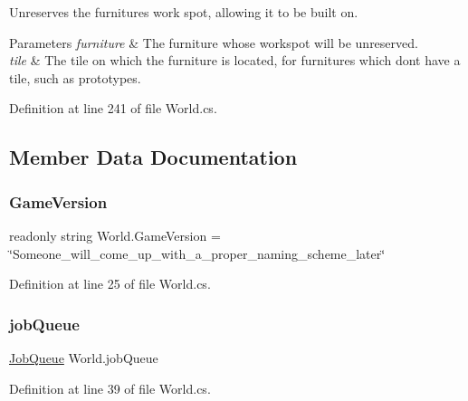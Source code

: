 Unreserves the furniture\textquotesingle{}s work spot, allowing it to be built on. 


\begin{DoxyParams}{Parameters}
{\em furniture} & The furniture whose workspot will be unreserved.\\
\hline
{\em tile} & The tile on which the furniture is located, for furnitures which don\textquotesingle{}t have a tile, such as prototypes.\\
\hline
\end{DoxyParams}


Definition at line 241 of file World.\+cs.



\subsection{Member Data Documentation}
\mbox{\label{class_world_a48a644d09cb24d4bd6c79cf7d438dc44}} 
\subsubsection{\texorpdfstring{Game\+Version}{GameVersion}}
{\footnotesize\ttfamily readonly string World.\+Game\+Version = \char`\"{}Someone\+\_\+will\+\_\+come\+\_\+up\+\_\+with\+\_\+a\+\_\+proper\+\_\+naming\+\_\+scheme\+\_\+later\char`\"{}}



Definition at line 25 of file World.\+cs.

\mbox{\label{class_world_a975e9e8ae481b92ef188e0421dac5ae6}} 
\subsubsection{\texorpdfstring{job\+Queue}{jobQueue}}
{\footnotesize\ttfamily \hyperlink{class_job_queue}{Job\+Queue} World.\+job\+Queue}



Definition at line 39 of file World.\+cs.

\mbox{\label{class_world_a561e1ac531ff776e3fe193312313c60d}} 
